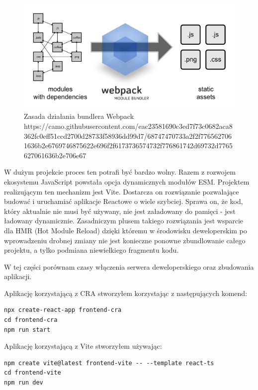 \documentclass{article}
\begin{document}
\begin{figure}[H]
    \centering
    \includegraphics[width=\textwidth]{webpack.png}
    \caption{Zasada działania bundlera Webpack https://camo.githubusercontent.com/eac23581690c3ed7f73c0682aca8362fc0eff51ccd2700d28733f58936dd99d7/68747470733a2f2f7765627061636b2e6769746875622e696f2f6173736574732f776861742d69732d7765627061636b2e706e67}
    \label{fig:ast}
\end{figure}

W dużym projekcie proces ten potrafi być bardzo wolny. Razem z rozwojem ekosystemu JavaScript powstała opcja dynamicznych modułów ESM. Projektem realizującym ten mechanizm jest Vite. Dostarcza on rozwiązanie pozwalające budować i uruchamiać aplikacje Reactowe o wiele szybciej. Sprawa on, że kod, który aktualnie nie musi być używany, nie jest załadowany do pamięci - jest ładowany dynamicznie. Zasadniczym plusem takiego rozwiązania jest wsparcie dla HMR (Hot Module Reload) dzięki któremu w środowisku deweloperskim po wprowadzeniu drobnej zmiany nie jest konieczne ponowne zbundlowanie całego projektu, a tylko podmiana niewielkiego fragmentu kodu.

W tej części porównam czasy włączenia serwera deweloperskiego oraz zbudowania aplikacji.

Aplikację korzystającą z CRA stworzyłem korzystając z następujących komend:

\begin{lstlisting}[caption=Stworzenie i włączenie aplikacji React (CRA)]
npx create-react-app frontend-cra
cd frontend-cra
npm run start
\end{lstlisting}

Aplikację korzystającą z Vite stworzyłem używając: 

\begin{lstlisting}[caption=Stworzenie i włączenie aplikacji React (CRA)]
npm create vite@latest frontend-vite -- --template react-ts
cd frontend-vite
npm run dev
\end{lstlisting}
\end{document}
